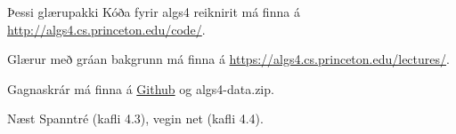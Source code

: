 \documentclass{beamer}
\begin{document}
\begin{frame}{Þessi glærupakki}
	Kóða fyrir algs4 reiknirit má finna á \url{http://algs4.cs.princeton.edu/code/}.

	Glærur með gráan bakgrunn má finna á \url{https://algs4.cs.princeton.edu/lectures/}.

	Gagnaskrár má finna á \href{https://github.com/Ernir/kennsluefni/tree/master/T2/Code/w11}{Github} og algs4-data.zip.
\end{frame}

\begin{frame}{Næst}
	Spanntré (kafli 4.3), vegin net (kafli 4.4).
\end{frame}
\end{document}
